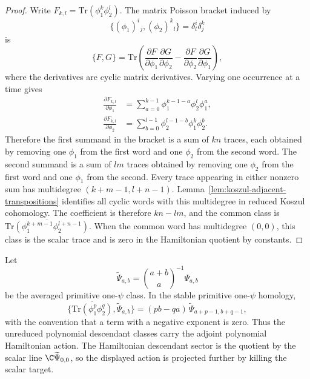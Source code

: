 \documentclass[11pt]{memoir}
\begin{document}
\begin{proof}
  Write $F_{k,l}=\mathrm{Tr}(\phi_1^k\phi_2^l)$. The matrix Poisson bracket
  induced by
  $$\{(\phi_1)^i{}_j,(\phi_2)^k{}_l\}=\delta^i_l\delta^k_j$$
  is
  $$\{F,G\}=\mathrm{Tr}\left(
      \frac{\partial F}{\partial\phi_1}\frac{\partial G}{\partial\phi_2}
      -\frac{\partial F}{\partial\phi_2}\frac{\partial G}{\partial\phi_1}
    \right),$$
  where the derivatives are cyclic matrix derivatives. Varying one occurrence
  at a time gives
  \begin{align*}
  \frac{\partial F_{k,l}}{\partial\phi_1}
    &=\sum_{a=0}^{k-1}\phi_1^{k-1-a}\phi_2^l\phi_1^a,\\
  \frac{\partial F_{k,l}}{\partial\phi_2}
    &=\sum_{b=0}^{l-1}\phi_2^{l-1-b}\phi_1^k\phi_2^b.
  \end{align*}
  Therefore the first summand in the bracket is a sum of $kn$ traces, each
  obtained by removing one $\phi_1$ from the first word and one $\phi_2$ from
  the second word. The second summand is a sum of $lm$ traces obtained by
  removing one $\phi_2$ from the first word and one $\phi_1$ from the second.
  Every trace appearing in either nonzero sum has multidegree
  $(k+m-1,l+n-1)$. Lemma~\ref{lem:koszul-adjacent-transpositions} identifies all cyclic words
  with this multidegree in reduced Koszul cohomology. The coefficient is
  therefore $kn-lm$, and the common class is
  $\overline{\mathrm{Tr}(\phi_1^{k+m-1}\phi_2^{l+n-1})}$. When the common word
  has multidegree $(0,0)$, this class is the scalar trace and is zero in the
  Hamiltonian quotient by constants.
\end{proof}

\begin{prop}\label{prop:open-descendant-action}
  Let
  $$\widetilde\Psi_{a,b}
    =\binom{a+b}{a}^{-1}\Psi_{a,b}$$
  be the averaged primitive one-$\psi$ class. In the stable primitive one-$\psi$
  homology,
  $$\{\overline{\mathrm{Tr}(\phi_1^p\phi_2^q)},\widetilde\Psi_{a,b}\}
    =(pb-qa)\,\widetilde\Psi_{a+p-1,b+q-1},$$
  with the convention that a term with a negative exponent is zero. Thus the
  unreduced polynomial descendant classes carry the adjoint polynomial
  Hamiltonian action. The Hamiltonian descendant sector is the quotient by the
  scalar line $\C\widetilde\Psi_{0,0}$, so the displayed action is projected
  further by killing the scalar target.
\end{prop}
\end{document}
